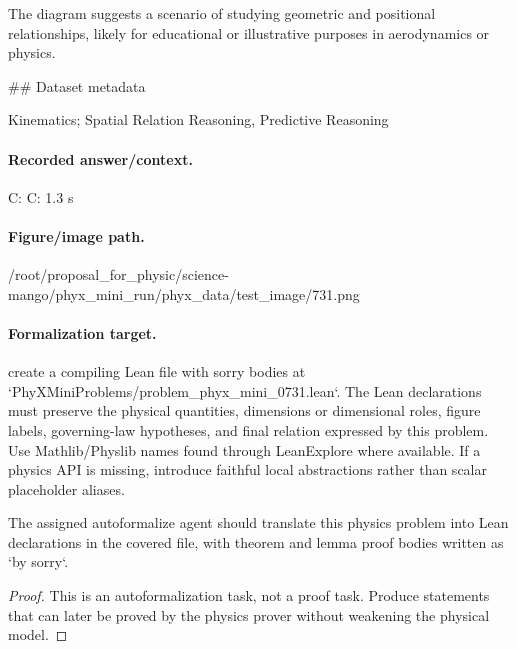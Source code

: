 The diagram suggests a scenario of studying geometric and positional relationships, likely for educational or illustrative purposes in aerodynamics or physics.

\#\# Dataset metadata

Kinematics; Spatial Relation Reasoning, Predictive Reasoning

\paragraph{Recorded answer/context.}
C: C: 1.3 s

\paragraph{Figure/image path.}
/root/proposal\_for\_physic/science-mango/phyx\_mini\_run/phyx\_data/test\_image/731.png

\paragraph{Formalization target.}
create a compiling Lean file with sorry bodies at `PhyXMiniProblems/problem\_phyx\_mini\_0731.lean`. The Lean declarations must preserve the physical quantities, dimensions or dimensional roles, figure labels, governing-law hypotheses, and final relation expressed by this problem.
Use Mathlib/Physlib names found through LeanExplore where available. If a physics API is missing, introduce faithful local abstractions rather than scalar placeholder aliases.

\begin{theorem}
\label{thm:physics:phyx_mini_0731:target}
The assigned autoformalize agent should translate this physics problem into Lean declarations in the covered file, with theorem and lemma proof bodies written as `by sorry`.
\end{theorem}
\begin{proof}
This is an autoformalization task, not a proof task. Produce statements that can later be proved by the physics prover without weakening the physical model.
\end{proof}

